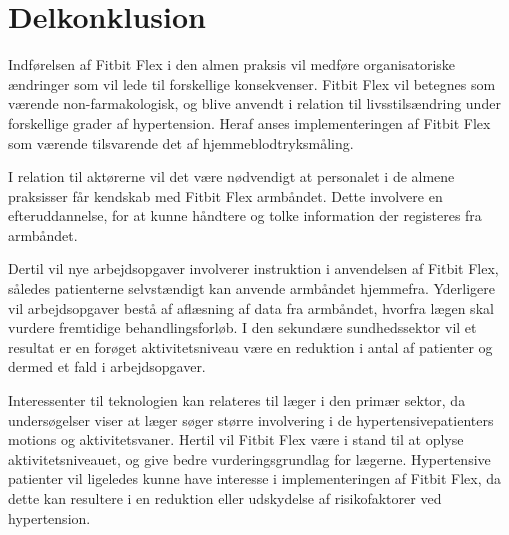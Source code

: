 \section{Delkonklusion}
Indførelsen af Fitbit Flex i den almen praksis vil medføre organisatoriske ændringer som vil lede til forskellige konsekvenser. Fitbit Flex vil betegnes som værende non-farmakologisk, og blive anvendt i relation til livsstilsændring under forskellige grader af hypertension. Heraf anses implementeringen af Fitbit Flex som værende tilsvarende det af hjemmeblodtryksmåling.

I relation til aktørerne vil det være nødvendigt at personalet i de almene praksisser får kendskab med Fitbit Flex armbåndet. Dette involvere en efteruddannelse, for at kunne håndtere og tolke information der registeres fra armbåndet. 

Dertil vil nye arbejdsopgaver involverer instruktion i anvendelsen af Fitbit Flex, således patienterne selvstændigt kan anvende armbåndet hjemmefra. Yderligere vil arbejdsopgaver bestå af aflæsning af data fra armbåndet, hvorfra lægen skal vurdere fremtidige behandlingsforløb. I den sekundære sundhedssektor vil et resultat er en forøget aktivitetsniveau være en reduktion i antal af patienter og dermed et fald i arbejdsopgaver.  

Interessenter til teknologien kan relateres til læger i den primær sektor, da undersøgelser viser at læger søger større involvering i de hypertensivepatienters motions og aktivitetsvaner. Hertil vil Fitbit Flex være i stand til at oplyse aktivitetsniveauet, og give bedre vurderingsgrundlag for lægerne. 
Hypertensive patienter vil ligeledes kunne have interesse i implementeringen af Fitbit Flex, da dette kan resultere i en reduktion eller udskydelse af risikofaktorer ved hypertension.  





\begin{comment}
OBS: TILFØJ PATIENTER TIL OMGIVELSER!
- Ligeledes ville patienterne være interesseret i teknologien, da en eventuel stigning i aktivitet ville resultere i færre eller en udskydelse af følgesygdomme/symptomer. 

SKAL DET TILFØJES AT IFT DEN STRUKTURELLE IMPLEMENTERING ER DET PÅ LIGE FOD MED HJEMMEBLODTRYKSMÅLING? 



Kan implementeres på samme vis som hjemmeblodtryksmåling. 
Implementeringen kan antages at lede til en reduktion af patienter ‘i primær og sekundær sektor/påvirke samspillet mellem primær og sekundær sektor’, da korrekt vejledning omkring motion kan reducere følgevirkningerne ved hypertension. 
Personale: For korrekt vejledning skal personale i den almene praksis oplæres i at forstå data fra armbåndet, og være i stand til at introducere patienter at anvende armbåndet.
\end{comment}